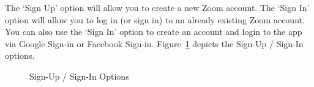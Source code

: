 \documentclass[14pt]{report}
\begin{document}
                        The `Sign Up' option will allow you to create a new Zoom account. The `Sign In' option will allow you to log in (or sign in) to an already existing Zoom account. You can also use the `Sign In' option to create an account and login to the app via Google Sign-in or Facebook Sign-in. Figure~\ref{fig:SignOptions} depicts the Sign-Up / Sign-In options.\\
                        \begin{figure}[H]
                            \centering
                            \qquad
                            \caption{Sign-Up / Sign-In Options}%
                            \label{fig:SignOptions}%
                        \end{figure}
\end{document}
